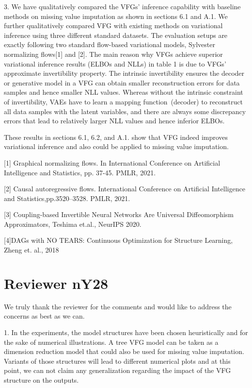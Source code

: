 \documentclass{article}
\begin{document}
 3. We have qualitatively compared the VFGs' inference capability with baseline methods on missing value imputation as shown in sections 6.1 and A.1.  We further qualitatively compared VFG with existing methods on variational inference using three different standard datasets.  The evaluation setups are exactly following two standard flow-based variational models, Sylvester normalizing flows[1] and [2].  The main reason why VFGs achieve superior variational inference results (ELBOs and  NLLs) in table 1 is due to VFGs' approximate invertibility property. The intrinsic invertibility ensures the decoder or generative model in a VFG  can obtain smaller reconstruction errors for data samples and hence smaller NLL values. Whereas without the intrinsic constraint of invertibility, VAEs have to learn a mapping function~(decoder) to reconstruct all data samples with the latent variables, and there are always some discrepancy errors that lead to relatively larger NLL values and hence inferior ELBOs.
 
 These results in sections  6.1, 6.2, and A.1. show that VFG indeed improves variational inference and also could be applied to missing value imputation. 
 
[1] Graphical normalizing flows. In International Conference on Artificial Intelligence and Statistics, pp. 37-45. PMLR, 2021.

[2] Causal autoregressive flows. International Conference on Artificial Intelligence and Statistics,pp.3520--3528. PMLR, 2021.

[3] Coupling-based Invertible Neural Networks Are Universal Diffeomorphism Approximators, Teshima et.al., NeurIPS 2020.

[4]DAGs with NO TEARS: Continuous Optimization for Structure Learning, Zheng et. al., 2018


\section{Reviewer nY28}
We truly thank the reviewer for the comments and would like to address the concerns as best as we can. 

1. In the experiments, the model structures have been chosen heuristically and for the sake of numerical illustrations. A tree VFG model can be taken as a dimension reduction model that could also be used for missing value imputation.  Variants of those structures will lead to different numerical plots and at this point, we can not claim any generalization regarding the impact of the VFG structure on the outputs.
\end{document}
